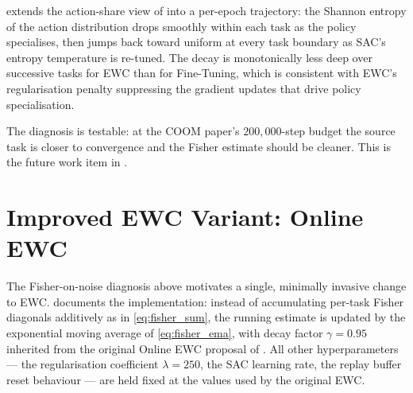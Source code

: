  extends the action-share view of
 into a per-epoch trajectory: the
Shannon entropy of the action distribution drops smoothly
within each task as the policy specialises, then jumps back
toward uniform at every task boundary as SAC's entropy
temperature is re-tuned. The decay is monotonically less
deep over successive tasks for EWC than for Fine-Tuning,
which is consistent with EWC's regularisation penalty
suppressing the gradient updates that drive policy
specialisation.

The diagnosis is testable: at the COOM paper's $200{,}000$-step
budget the source task is closer to convergence and the Fisher
estimate should be cleaner. This is the future work item in
.

\section{Improved EWC Variant: Online EWC}
\label{sec:ewc_online}

The Fisher-on-noise diagnosis above motivates a single,
minimally invasive change to EWC. 
documents the implementation: instead of accumulating per-task
Fisher diagonals additively as in \cref{eq:fisher_sum}, the
running estimate is updated by the exponential moving average
of \cref{eq:fisher_ema}, with decay factor $\gamma = 0.95$
inherited from the original Online EWC proposal of
\citet{schwarz2018progress}. All other hyperparameters --- the
regularisation coefficient $\lambda = 250$, the SAC learning
rate, the replay buffer reset behaviour --- are held fixed at
the values used by the original EWC.

\begin{table}[t]
    \centering
    \caption{Online EWC vs original EWC at the same CO4 /
        $20{,}000$-step budget. Last-five-epoch mean training
        success per task. Values for original EWC are
        reproduced from  for ease of
        comparison; the Online EWC row is added in this
        section.}
    \label{tab:ewc_online}
\end{table}

